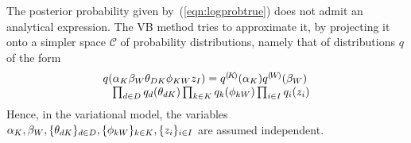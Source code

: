 The posterior probability given by~(\ref{eqn:logprobtrue}) does not admit an analytical expression. The VB method tries to approximate it, by projecting it onto a simpler space $\mathcal{C}$ of probability distributions, namely that of distributions $q$ of the form
\begin{equation}
\label{eqn:probvar}
\begin{array}{l}
q(\alpha_K\beta_W\theta_{DK}\phi_{KW}z_I) = {q}^{(\!{K}\!)}(\alpha_K){q}^{(\!{W}\!)}(\beta_W)\\
\;\;\;\prod_{d\in D}q_d(\theta_{dK})\prod_{k\in K}q_k(\phi_{kW})
\prod_{i\in I}q_i(z_i)
\end{array}
\end{equation}
Hence, in the variational model, the variables $\alpha_K,\beta_W,\{\theta_{dK}\}_{d\in D},\{\phi_{kW}\}_{k\in K},\{z_i\}_{i\in I}$ are assumed independent.
